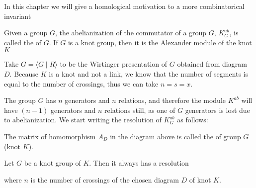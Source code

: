 
\medskip

{\color{red}
In this chapter we will give a homological motivation to a more combinatorical invariant}

\begin{definition}
  Given a group $G$, the abelianization of the commutator of a group $G$, $K_G^{ab}$, is called the  of $G$. If $G$ is a knot group, then it is the Alexander module of the knot $K$
\end{definition}

Take $G=\langle G\;|\;R\rangle$ to be the Wirtinger presentation of $G$ obtained from diagram $D$. Because $K$ is a knot and not a link, we know that the number of segments is equal to the number of crossings, thus we can take $n=s=x$.

The group $G$ has $n$ generators and $n$ relations, and therefore the module $K^{ab}$ will have $(n-1)$ generators and $n$ relations still, as one of $G$ generators is lost due to abelianization. We start writing the resolution of $K_G^{ab}$ as follows:
\begin{center}
\end{center}

\begin{definition}
  The matrix of homomorphism $A_D$ in the diagram above is called the  of group $G$ (knot $K$).
\end{definition}


\begin{proposition}
  Let $G$ be a knot group of $K$. Then it always has a resolution
  \begin{center}
  \end{center}
  where $n$ is the number of crossings of the chosen diagram $D$ of knot $K$.
\end{proposition}

